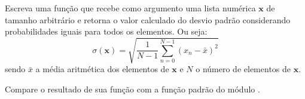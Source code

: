 Escreva uma função que recebe como argumento uma lista numérica $\mathbf{x}$ de tamanho arbitrário e retorna o
valor calculado do desvio padrão considerando probabilidades iguais para todos os elementos.
Ou seja:
\begin{equation}
    \sigma(\mathbf{x}) = \sqrt{\dfrac{1}{N-1} \sum _{n=0} ^{N-1} \left( x_n - \bar{x} \right)^2}
\end{equation}
sendo $\bar{x}$ a média aritmética dos elementos de $\mathbf{x}$ e $N$ o número de elementos de $\mathbf{x}$.

Compare o resultado de sua função com a função padrão  do módulo .



